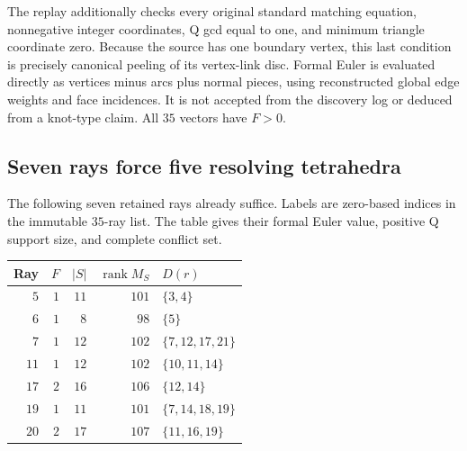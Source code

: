 The replay additionally checks every original standard matching equation,
nonnegative integer coordinates, Q gcd equal to one, and minimum triangle
coordinate zero.  Because the source has one boundary vertex, this last
condition is precisely canonical peeling of its vertex-link disc.
Formal Euler is evaluated directly as vertices minus arcs plus normal
pieces, using reconstructed global edge weights and face incidences.
It is not accepted from the discovery log or deduced from a knot-type
claim.  All $35$ vectors have $F>0$.

\subsection{Seven rays force five resolving tetrahedra}

The following seven retained rays already suffice.  Labels are
zero-based indices in the immutable $35$-ray list.  The table gives their
formal Euler value, positive Q support size, and complete conflict set.
\begin{center}
\begin{tabular}{rrrrl}
Ray & $F$ & $|S|$ & $\operatorname{rank}M_S$ & $D(r)$\\
\hline
$5$  & $1$ & $11$ & $101$ & $\{3,4\}$\\
$6$  & $1$ & $8$  & $98$  & $\{5\}$\\
$7$  & $1$ & $12$ & $102$ & $\{7,12,17,21\}$\\
$11$ & $1$ & $12$ & $102$ & $\{10,11,14\}$\\
$17$ & $2$ & $16$ & $106$ & $\{12,14\}$\\
$19$ & $1$ & $11$ & $101$ & $\{7,14,18,19\}$\\
$20$ & $2$ & $17$ & $107$ & $\{11,16,19\}$
\end{tabular}
\end{center}

